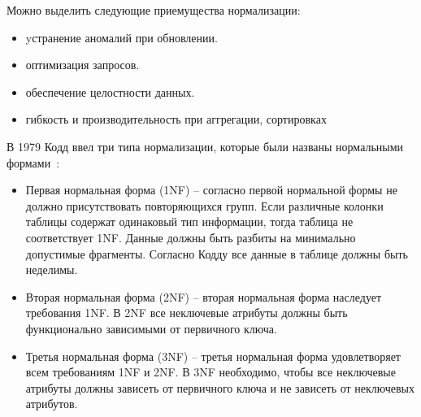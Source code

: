 Можно выделить следующие приемущества нормализации:
\begin{itemize}[label=---]
    \item yстранение аномалий при обновлении.  
    \item оптимизация запросов.  
    \item обеспечение целостности данных.  
    \item гибкость и производительность при аггрегации, сортировках 
\end{itemize}

В 1979 Кодд ввел три типа нормализации, которые были названы нормальными формами~\cite{Codd_NF}:
\begin{itemize}[label=---]
    \item Первая нормальная форма (1NF) -- согласно первой нормальной формы не должно присутствовать повторяющихся групп.
    Если различные колонки таблицы содержат одинаковый тип информации,
    тогда таблица не соответствует 1NF.
    Данные должны быть разбиты на минимально допустимые фрагменты.
    Согласно Кодду все данные в таблице должны быть неделимы.
    
    \item Вторая нормальная форма (2NF) -- вторая нормальная форма наследует требования 1NF.
    В 2NF все неключевые атрибуты должны быть функционально зависимыми от первичного ключа.
    
    \item Третья нормальная форма (3NF) -- третья нормальная форма удовлетворяет всем требованиям 1NF и 2NF.
    В 3NF необходимо, чтобы все неключевые атрибуты должны зависеть от первичного ключа и не зависеть от неключевых атрибутов.
\end{itemize}

